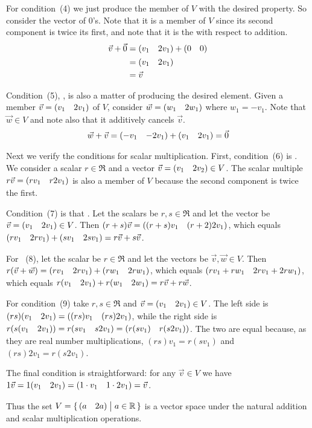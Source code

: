 \documentclass[10pt,t,serif,professionalfont]{beamer}
\begin{document}
\begin{frame}
\pause
For condition~(4) we just produce the member of $V$ with the desired 
property. 
So consider the vector of $0$'s.
Note that it is a member of $V$ since its second component is twice its first,
and note that it is the 
with respect to addition. 
\begin{align*}
  \vec{v}+\vec{0}
  &=(\begin{matrix} v_1 &2v_1 \end{matrix})+(\begin{matrix} 0  &0 \end{matrix})     \\
  &=(\begin{matrix} v_1 &2v_1 \end{matrix})    \\
  &=\vec{v}
\end{align*}
\end{frame}\begin{frame}
Condition~(5), , is also a matter of 
producing the desired element.
Given a member $\vec{v}=(\begin{matrix} v_1 &2v_1 \end{matrix})$ of $V$, consider
$\vec{w}=(\begin{matrix} w_1 &2w_1 \end{matrix})$ where $w_1=-v_1$.
Note that $\vec{w}\in V$ and note also that it 
additively cancels $\vec{v}$.
\begin{equation*}
  \vec{w}+\vec{v}=(\begin{matrix} -v_1 &-2v_1 \end{matrix})+(\begin{matrix} v_1 &2v_1 \end{matrix})=\vec{0}
\end{equation*}

\pause
Next we verify the conditions for scalar multiplication.
First, condition~(6) is .
We consider a scalar $r\in\Re$ and a vector $\vec{v}=(\begin{matrix} v_1 &2v_2 \end{matrix})\in V$.
The scalar multiple $r\vec{v}=(\begin{matrix} rv_1 &r2v_1 \end{matrix})$ is also a member
of $V$ because the second component is twice the first.

\pause
Condition~(7) is that 
.
Let the scalars be $r,s\in\Re$ and 
let the vector be $\vec{v}=(\begin{matrix} v_1 &2v_1 \end{matrix})\in V$.
Then $(r+s)\vec{v}=(\begin{matrix} (r+s)v_1 &(r+2)2v_1 \end{matrix})$,
which equals $(\begin{matrix} rv_1 &2rv_1 \end{matrix})+(\begin{matrix} sv_1 &2sv_1 \end{matrix})=r\vec{v}+s\vec{v}$.
\end{frame}\begin{frame}
For 
~(8),
let the scalar be $r\in\Re$ and 
let the vectors be $\vec{v},\vec{w}\in V$.
Then $r(\vec{v}+\vec{w})=(\begin{matrix} rv_1 &2rv_1 \end{matrix})+(\begin{matrix} rw_1 &2rw_1 \end{matrix})$,
which equals $(\begin{matrix} rv_1+rw_1 &2rv_1+2rw_1 \end{matrix})$,
which equals 
$r(\begin{matrix} v_1 &2v_1 \end{matrix})+r(\begin{matrix} w_1 &2w_1 \end{matrix})=r\vec{v}+r\vec{w}$.

\pause
For condition~(9) take $r,s\in\Re$ and $\vec{v}=(\begin{matrix} v_1 &2v_1 \end{matrix})\in V$.
The left side is $(rs)(\begin{matrix} v_1 &2v_1 \end{matrix})=(\begin{matrix} (rs)v_1 &(rs)2v_1 \end{matrix})$, while the
right side is 
$r(s(\begin{matrix} v_1 &2v_1 \end{matrix}))=r(\begin{matrix} sv_1 &s2v_1 \end{matrix})=(\begin{matrix} r(sv_1) &r(s2v_1) \end{matrix})$.
The two are equal because, as they are real number multiplications,
$(rs)v_1=r(sv_1)$ and $(rs)2v_1=r(s2v_1)$.   

\pause
The final condition is straightforward:
for any $\vec{v}\in V$ we have
$1\vec{v}=1(\begin{matrix} v_1 &2v_1 \end{matrix})=(\begin{matrix} 1\cdot v_1 &1\cdot 2v_1 \end{matrix})=\vec{v}$.

\pause\medskip
Thus the set
$V=\mbox{$\{\,(\begin{matrix} a  &2a \end{matrix})\bigm| a\in\mathbb{R}\,\}$}$
is a vector space under the natural addition and scalar multiplication 
operations.
\end{frame}
\end{document}
